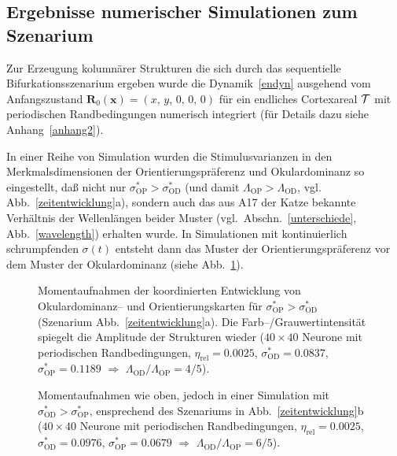 \subsection{Ergebnisse numerischer Simulationen zum Szenarium}
\label{numerg}

Zur Erzeugung kolumnärer Strukturen die sich durch das sequentielle
Bifurkationsszenarium ergeben wurde die Dynamik~\eqref{endyn} ausgehend vom
Anfangszustand $\mathbf{R}_0(\mathbf{x}) = (x,\, y,\, 0,\, 0,\, 0) $ für
ein endliches Cortexareal $\cal T$ mit periodischen Randbedingungen
numerisch integriert (für Details dazu siehe Anhang~\ref{anhang2}).

In einer Reihe von  Simulation  wurden die Stimulusvarianzen in den
Merkmalsdimensionen der Orientierungspräferenz und Okulardominanz  so
eingestellt, daß nicht nur $\sigma^\ast_{\text{OP}}>\sigma^\ast_{\text{OD}}$
(und damit $\Lambda_{\text{OP}} > \Lambda_{\text{OD}}$,
vgl. Abb.~\ref{zeitentwicklung}a), sondern auch
das aus A17 der Katze bekannte Verhältnis der Wellenlängen beider
Muster (vgl.~Abschn.~\ref{unterschiede}, Abb.~\ref{wavelength})
erhalten wurde.  In Simulationen mit kontinuierlich schrumpfenden
$\sigma(t)$ entsteht dann das Muster der Orientierungspräferenz vor dem
Muster der Okulardominanz (siehe Abb.~\ref{opod}).

\begin{figure}[p]
\begin{center}
\begin{sideways}
\end{sideways}
\end{center}
\caption{Momentaufnahmen der koordinierten Entwicklung von Okular\-do\-minanz--
und Orientierungskarten für
$\sigma^\ast_{\text{OP}}>\sigma^\ast_{\text{OD}}$ (Szenarium
Abb.~\ref{zeitentwicklung}a). Die Farb--/Grauwertintensität spiegelt
die Amplitude der Strukturen wieder ($40\times 40$ Neurone mit periodischen
Randbedingungen, $\eta_{\text{rel}}=0.0025$,
$\sigma^\ast_{\text{OD}}=0.0837$, $\sigma^\ast_{\text{OP}}=0.1189$
$\Longrightarrow$ $\Lambda_{\text{OD}}/\Lambda_{\text{OP}}=4/5$).}
\label{opod}
\end{figure}

\begin{figure}[p]
\begin{center}
\begin{sideways}
\end{sideways}
\end{center}
\caption{Momentaufnahmen wie oben, jedoch in einer Simulation mit
$\sigma^\ast_{\text{OD}}>\sigma^\ast_{\text{OP}}$, ensprechend des Szenariums in
Abb.~\ref{zeitentwicklung}b ($40\times 40$ Neurone mit
periodischen Randbedingungen, $\eta_{\text{rel}}= 0.0025$,
$\sigma^\ast_{\text{OD}}=0.0976$, $\sigma^\ast_{\text{OP}}=0.0679$
$\Longrightarrow$ $\Lambda_{\text{OD}}/\Lambda_{\text{OP}}=6/5$).}
\label{odop}
\end{figure}

